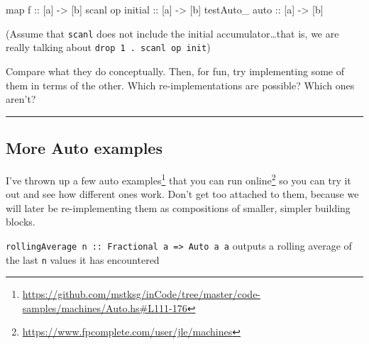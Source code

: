 \documentclass[]{article}
\newenvironment{Shaded}{}{}
\newcommand{\OtherTok}[1]{\textcolor[rgb]{0.00,0.44,0.13}{{#1}}}
\newcommand{\NormalTok}[1]{{#1}}
\renewcommand{\href}[2]{#2\footnote{\url{#1}}}
\begin{document}
\begin{Shaded}
\begin{Highlighting}[]
\NormalTok{map}\OtherTok{       f          ::} \NormalTok{[a] }\OtherTok{->} \NormalTok{[b]}
\NormalTok{scanl     op}\OtherTok{ initial ::} \NormalTok{[a] }\OtherTok{->} \NormalTok{[b]}
\NormalTok{testAuto_}\OtherTok{ auto       ::} \NormalTok{[a] }\OtherTok{->} \NormalTok{[b]}
\end{Highlighting}
\end{Shaded}

(Assume that \texttt{scanl} does not include the initial accumulator\ldots{}that
is, we are really talking about \texttt{drop\ 1\ .\ scanl\ op\ init})

Compare what they do conceptually. Then, for fun, try implementing some of them
in terms of the other. Which re-implementations are possible? Which ones aren't?

\begin{center}\rule{0.5\linewidth}{\linethickness}\end{center}

\subsection{More Auto examples}\label{more-auto-examples}

\href{https://github.com/mstksg/inCode/tree/master/code-samples/machines/Auto.hs\#L111-176}{I've
thrown up a few auto examples}
\href{https://www.fpcomplete.com/user/jle/machines}{that you can run online} so
you can try it out and see how different ones work. Don't get too attached to
them, because we will later be re-implementing them as compositions of smaller,
simpler building blocks.

\begin{description}
\tightlist
\item[\href{https://github.com/mstksg/inCode/tree/master/code-samples/machines/Auto.hs\#L111-122}{rollingAverage}]
\texttt{rollingAverage\ n\ ::\ Fractional\ a\ =\textgreater{}\ Auto\ a\ a}
outputs a rolling average of the last \texttt{n} values it has encountered
\end{description}
\end{document}
